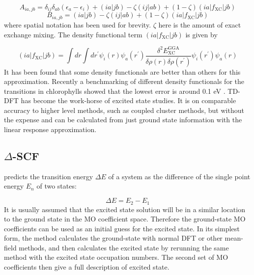 \begin{equation}
A_{ia, jb} = \delta_{ij} \delta_{ab} \left(\epsilon_a - \epsilon_i \right) + \left(ia|jb\right) - \zeta\left(ij|ab\right) + \left(1-\zeta\right)\left(ia|f_{\text{XC}}|jb\right)
\end{equation}
%
\begin{equation}
B_{ia, jb} = \left(ia|jb\right) - \zeta\left(ij|ab\right) + \left(1-\zeta\right)\left(ia|f_{\text{XC}}|jb\right)
\end{equation}
%
where spatial notation has been used for brevity. $\zeta$ here is the amount of 
exact exchange mixing. The density functional term $\left(ia|f_{\text{XC}}|jb\right)$ 
is given by

\begin{equation}
    \left(ia|f_{\text{XC}}|jb\right) = \int dr \int dr^\prime \psi_i \left(r\right)\psi_a \left(r^\prime\right) \frac{\delta^2 E^{\text{GGA}}_{\text{XC}}}{\delta\rho\left(r\right)\delta\rho\left(r^\prime\right)} \psi_i \left(r^\prime\right)\psi_a \left(r\right)
\end{equation}
%
It has been found that some density functionals are better than others for this
approximation. Recently a benchmarking of different density functionals for the 
\Qy transitions in chlorophylls showed that the lowest error is around 0.1 eV \cite{List2013}. 
TD-DFT has become the work-horse of excited state studies. It is on comparable accuracy
to higher level methods, such as coupled cluster methods, but without the expense\cite{Laurent2013}
and can be calculated from just ground state information with the linear response
approximation.

\subsection{$\Delta$-SCF}
\label{subsec{dscf_and_eigdiff}}

\dscf predicts the transition energy $\Delta E$ of a system as the difference of
the single point energy $E_n$ of two states:

\begin{equation}
\Delta E = E_{2} - E_{1}
\end{equation}
%
It is usually assumed that the excited state solution will be in a similar
location to the ground state in the MO coefficient space. Therefore the ground-state
MO coefficients can be used as an initial guess for the excited state. In its simplest
form, the \dscf method calculates the ground-state with normal DFT or other mean-field
methods, and then calculates the excited state by rerunning the same method with 
the excited state occupation numbers. The second set of MO coefficients then give
a full description of excited state.

